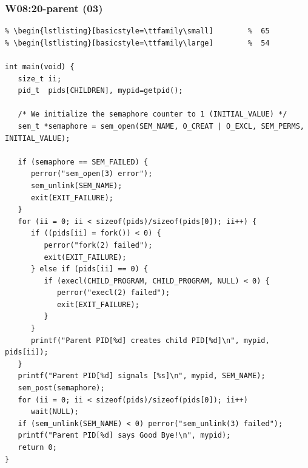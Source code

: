 \documentclass[xcolor=table, notheorems, hyperref={pdfpagelabels=false}]{beamer}
\begin{document}
\begin{frame}[fragile]
\frametitle{W08:20-parent (03)}
\begin{lstlisting}[basicstyle=\ttfamily\tiny]         % 108
% \begin{lstlisting}[basicstyle=\ttfamily\footnotesize] %  72
% \begin{lstlisting}[basicstyle=\ttfamily\small]        %  65
% \begin{lstlisting}[basicstyle=\ttfamily\large]        %  54

int main(void) {
   size_t ii;
   pid_t  pids[CHILDREN], mypid=getpid();

   /* We initialize the semaphore counter to 1 (INITIAL_VALUE) */
   sem_t *semaphore = sem_open(SEM_NAME, O_CREAT | O_EXCL, SEM_PERMS, INITIAL_VALUE);

   if (semaphore == SEM_FAILED) {
      perror("sem_open(3) error");
      sem_unlink(SEM_NAME); 
      exit(EXIT_FAILURE);
   }
   for (ii = 0; ii < sizeof(pids)/sizeof(pids[0]); ii++) {
      if ((pids[ii] = fork()) < 0) {
         perror("fork(2) failed");
         exit(EXIT_FAILURE);
      } else if (pids[ii] == 0) {
         if (execl(CHILD_PROGRAM, CHILD_PROGRAM, NULL) < 0) {
            perror("execl(2) failed");
            exit(EXIT_FAILURE);
         }
      }
      printf("Parent PID[%d] creates child PID[%d]\n", mypid, pids[ii]);
   }
   printf("Parent PID[%d] signals [%s]\n", mypid, SEM_NAME);
   sem_post(semaphore);
   for (ii = 0; ii < sizeof(pids)/sizeof(pids[0]); ii++)
      wait(NULL);
   if (sem_unlink(SEM_NAME) < 0) perror("sem_unlink(3) failed");
   printf("Parent PID[%d] says Good Bye!\n", mypid);
   return 0;
}

\end{lstlisting}
\end{frame}
\end{document}
